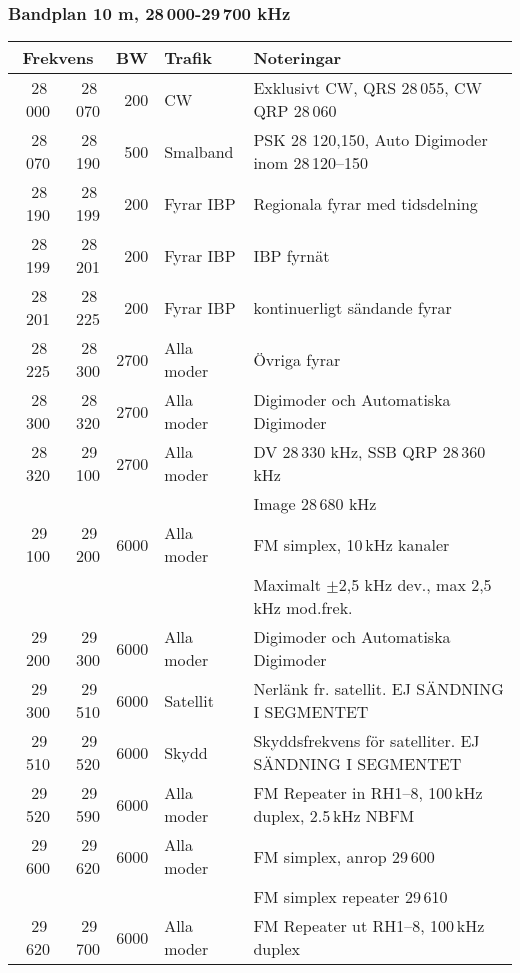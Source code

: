 \subsubsection{Bandplan 10 m, 28\,000-29\,700 kHz}
\begin{tabular}{rrrll}
\multicolumn{2}{c}{\textbf{Frekvens}} & \textbf{BW} & \textbf{Trafik} & \textbf{Noteringar} \\ \hline
28\,000 & 28\,070 & 200  & CW         & Exklusivt CW, QRS 28\,055, CW QRP 28\,060              \\ \hline
28\,070 & 28\,190 & 500  & Smalband   & PSK 28 120,150, Auto Digimoder inom 28\,120--150       \\ \hline
28\,190 & 28\,199 & 200  & Fyrar IBP  & Regionala fyrar med tidsdelning                        \\ \hline
28\,199 & 28\,201 & 200  & Fyrar IBP  & IBP fyrnät                                             \\ \hline
28\,201 & 28\,225 & 200  & Fyrar IBP  & kontinuerligt sändande fyrar                           \\ \hline
28\,225 & 28\,300 & 2700 & Alla moder & Övriga fyrar                                           \\ \hline
28\,300 & 28\,320 & 2700 & Alla moder & Digimoder och Automatiska Digimoder                    \\ \hline
28\,320 & 29\,100 & 2700 & Alla moder & DV 28\,330 kHz, SSB QRP 28\,360 kHz                    \\
        &         &      &            & Image 28\,680 kHz                                      \\ \hline
29\,100 & 29\,200 & 6000 & Alla moder & FM simplex, 10\,kHz kanaler                            \\
        &         &      &            & Maximalt $\pm$2,5 kHz dev., max 2,5\,kHz mod.frek.         \\ \hline
29\,200 & 29\,300 & 6000 & Alla moder & Digimoder och Automatiska Digimoder                    \\ \hline
29\,300 & 29\,510 & 6000 & Satellit   & Nerlänk fr. satellit. EJ SÄNDNING I SEGMENTET          \\ \hline
29\,510 & 29\,520 & 6000 & Skydd      & Skyddsfrekvens för satelliter. EJ SÄNDNING I SEGMENTET \\ \hline
29\,520 & 29\,590 & 6000 & Alla moder & FM Repeater in RH1--8, 100\,kHz duplex, 2.5\,kHz NBFM  \\ \hline
29\,600 & 29\,620 & 6000 & Alla moder & FM simplex, anrop 29\,600                              \\
        &         &      &            & FM simplex repeater 29\,610                            \\ \hline
29\,620 & 29\,700 & 6000 & Alla moder & FM Repeater ut RH1--8, 100\,kHz duplex                 \\ \hline
\end{tabular}
\newpage

